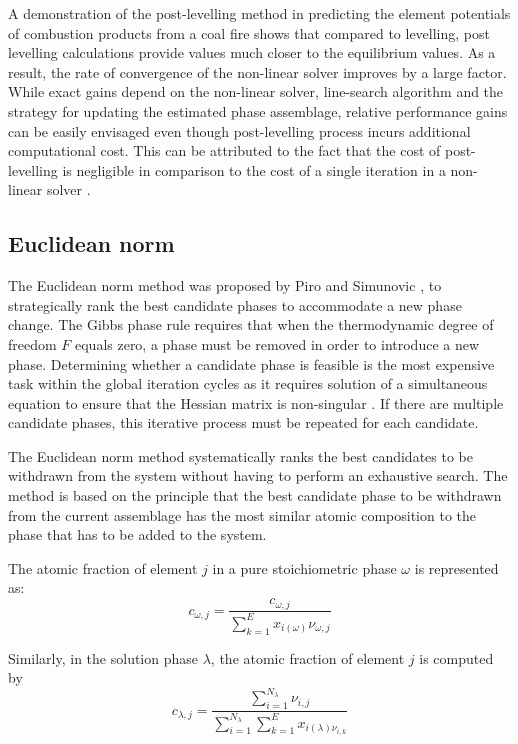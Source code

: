 		A demonstration of the post-levelling method in predicting the element potentials of combustion products from a coal fire shows that compared to levelling, post levelling calculations provide values much closer to the equilibrium values. As a result, the rate of convergence of the non-linear solver improves by a large factor.  While exact gains depend on the non-linear solver, line-search algorithm and the strategy for updating the estimated phase assemblage, relative performance gains can be easily envisaged even though post-levelling process incurs additional computational cost. This can be attributed to the fact that the cost of post-levelling is negligible in comparison to the cost of a single iteration in a non-linear solver \cite{Piro12a}. 
		
	\subsection{Euclidean norm} \label{sec:Euclidean}
	The Euclidean norm method was proposed by Piro and Simunovic \cite{Piro12a}, to strategically rank the best candidate phases to accommodate a new phase change. The Gibbs phase rule requires that when the thermodynamic degree of freedom $F$ equals zero, a phase must be removed in order to introduce a new phase. Determining whether a candidate phase is feasible is the most expensive task within the global iteration cycles as it requires solution of a simultaneous equation to ensure that the Hessian matrix is non-singular \cite{Piro12a}. If there are multiple candidate phases, this iterative process must be repeated for each candidate. 
	
	The Euclidean norm method systematically ranks the best candidates to be withdrawn from the system without having to perform an exhaustive search. The method is based on the principle that the best candidate phase to be withdrawn from the current assemblage has the most similar atomic composition to the phase that has to be added to the system.
	
	The atomic fraction of element $j$ in a pure stoichiometric phase $\omega$ is represented as:
	\begin{equation}
		c_{\omega,j} = \frac{c_{\omega,j}}{\sum_{k=1}^{E} x_{i(\omega)}\nu_{\omega,j}}
	\end{equation}
	
	Similarly, in the solution phase  $\lambda$, the atomic fraction of element $j$ is computed by
	\begin{equation}
		c_{\lambda,j} = \frac{\sum_{i=1}^{N_{\lambda}} \nu_{i,j}}{\sum_{i=1}^{N_{\lambda}} \sum_{k=1}^{E} x_{i(\lambda) \nu_{i,k}}}
	\end{equation}
	

